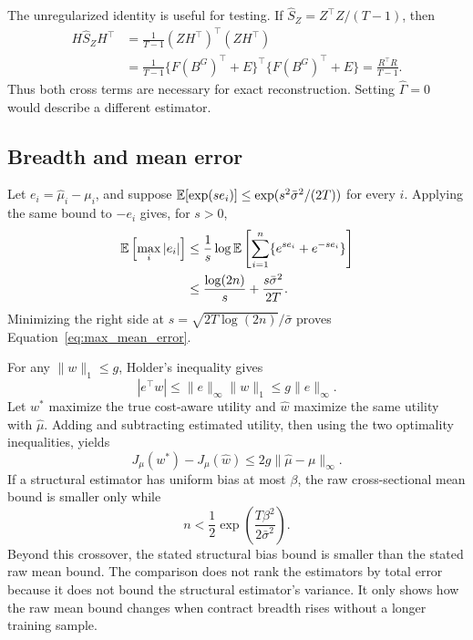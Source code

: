 The unregularized identity is useful for testing. If
\(\widehat S_Z=Z^\top Z/(T-1)\), then
\begin{align}
  H\widehat S_ZH^\top
  &=\frac{1}{T-1}(ZH^\top)^\top(ZH^\top) \nonumber\\
  &=\frac{1}{T-1}\{F(B^G)^\top+E\}^\top
    \{F(B^G)^\top+E\}
   =\frac{R^\top R}{T-1}.
  \label{eq:app_sample_reconstruction}
\end{align}
Thus both cross terms are necessary for exact reconstruction. Setting
\(\widehat\Gamma=0\) would describe a different estimator.

\subsection{Breadth and mean error}\label{app:mean_error_proof}

Let \(e_i=\widehat\mu_i-\mu_i\), and suppose
\(\mathbb{E}[\exp(se_i)]\le\exp(s^2\bar\sigma^2/(2T))\) for every \(i\). Applying the same bound
to \(-e_i\) gives, for \(s>0\),
\begin{align}
  \mathbb{E}\left[\max_i|e_i|\right]
  &\le\frac{1}{s}\log\mathbb{E}\left[\sum_{i=1}^n
       \{e^{se_i}+e^{-se_i}\}\right] \nonumber\\
  &\le\frac{\log(2n)}{s}+\frac{s\bar\sigma^2}{2T}.
  \label{eq:app_max_bound}
\end{align}
Minimizing the right side at
\(s=\sqrt{2T\log(2n)}/\bar\sigma\) proves
Equation~\eqref{eq:max_mean_error}.

For any \(\|w\|_1\le g\), Holder's inequality gives
\begin{equation}
  |e^\top w|\le\|e\|_\infty\|w\|_1\le g\|e\|_\infty.
  \label{eq:app_objective_error}
\end{equation}
Let \(w^*\) maximize the true cost-aware utility and \(\widehat w\) maximize the same
utility with \(\widehat\mu\). Adding and subtracting estimated utility, then using the two
optimality inequalities, yields
\begin{equation}
  J_\mu(w^*)-J_\mu(\widehat w)
  \le2g\|\widehat\mu-\mu\|_\infty.
  \label{eq:app_regret}
\end{equation}
If a structural estimator has uniform bias at most \(\beta\), the raw cross-sectional
mean bound is smaller only while
\begin{equation}
  n<\frac12\exp\!\left(\frac{T\beta^2}{2\bar\sigma^2}\right).
  \label{eq:app_crossover}
\end{equation}
Beyond this crossover, the stated structural bias bound is smaller than the stated raw
mean bound. The comparison does not rank the estimators by total error because it does
not bound the structural estimator's variance. It only shows how the raw mean bound
changes when contract breadth rises without a longer training sample.


